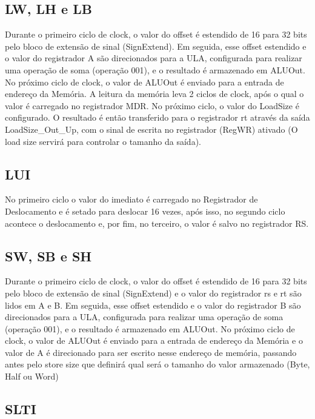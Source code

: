  \subsection{LW, LH e LB}

Durante o primeiro ciclo de clock, o valor do offset é estendido de 16 para 32 bits pelo bloco de extensão de sinal (SignExtend). Em seguida, esse offset estendido e o valor do registrador A são direcionados para a ULA, configurada para realizar uma operação de soma (operação 001), e o resultado é armazenado em ALUOut. No próximo ciclo de clock, o valor de ALUOut é enviado para a entrada de endereço da Memória. A leitura da memória leva 2 ciclos de clock, após o qual o valor é carregado no registrador MDR. No próximo ciclo, o valor do LoadSize é configurado. O resultado é então transferido para o registrador rt através da saída LoadSize\_Out\_Up, com o sinal de escrita no registrador (RegWR) ativado (O load size servirá para controlar o tamanho da saída).

\subsection{LUI}

No primeiro ciclo o valor do imediato é carregado no Registrador de Deslocamento e é setado para deslocar 16 vezes, após isso, no segundo ciclo acontece o deslocamento e, por fim, no terceiro, o valor é salvo no registrador RS.

\subsection{SW, SB e SH}

Durante o primeiro ciclo de clock, o valor do offset é estendido de 16 para 32 bits pelo bloco de extensão de sinal (SignExtend) e o valor do registrador rs e rt são lidos em A e B. Em seguida, esse offset estendido e o valor do registrador B são direcionados para a ULA, configurada para realizar uma operação de soma (operação 001), e o resultado é armazenado em ALUOut. No próximo ciclo de clock, o valor de ALUOut é enviado para a entrada de endereço da Memória e o valor de A é direcionado para ser escrito nesse endereço de memória, passando antes pelo store size que definirá qual será o tamanho do valor armazenado (Byte, Half ou Word)

\subsection{SLTI}

